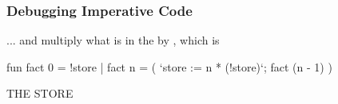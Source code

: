 \documentclass[aspectratio=169]{beamer}
\begin{document}
\begin{frame}[fragile]
  \frametitle{Debugging Imperative Code}

  \begin{minipage}[t][0.6in][t]{\textwidth}
    ... and multiply what is in the  by , which is 
  \end{minipage}

  \vspace{10pt}

  \begin{center}
    \begin{minipage}[t][1.7in][t]{0.6\textwidth}
      \vspace{\fill}
      \begin{codeblock}
        fun fact 0 = !store
          | fact n =
              ( `store := n * (!store)`;
                fact (n - 1)
              )
      \end{codeblock}
      \vspace{\fill}
    \end{minipage}
    \hfill\vline\hfill
    \begin{minipage}[t][1.7in][t]{0.3\textwidth}
      \centering
      {\hspace{-20pt}\color{gray} \large THE STORE}

      \vspace{\fill}
      \vspace{\fill}
    \end{minipage}
  \end{center}
\end{frame}
\end{document}
